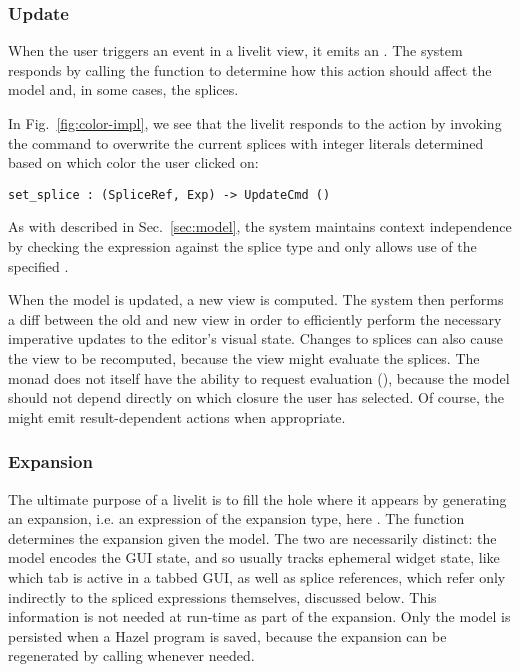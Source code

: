 \subsubsection{Update}\label{sec:def-update}
When the user triggers an event in a livelit view, it emits an .
The system responds by calling the  function to determine how 
this action should affect the model and, in some cases, the splices. 


In Fig.~\ref{fig:color-impl}, we see that the  livelit responds to 
the  action by invoking the  command to overwrite 
the current splices with integer literals determined based on which color the user
clicked on:
\begin{lstlisting}[numbers=none]
  set_splice : (SpliceRef, Exp) -> UpdateCmd ()
\end{lstlisting}
As with  described in Sec.~\ref{sec:model},
the system maintains context independence by checking the expression against the splice type 
and only allows use of the specified .

When the model is updated, a new view is 
computed. The system then performs a diff between the old and new view in order to 
efficiently perform the necessary imperative updates to the editor's visual state.
Changes to splices can also cause the view to be recomputed, because the view might 
evaluate the splices. The  monad does not itself 
have the ability to request evaluation (), because the model should not depend directly  
on which closure the user has selected. 
Of course, the  might emit 
result-dependent actions when appropriate.

\subsubsection{Expansion}
\label{sec:expansion}
The ultimate purpose of a livelit is to fill the hole where it appears by generating an expansion,
i.e. an expression of the expansion type, here .
The  function determines the expansion given the model. 
The two are necessarily distinct: the model encodes the GUI state, 
and so usually tracks ephemeral widget state, like which tab is active in a tabbed GUI, 
as well as splice references, which refer only indirectly to the spliced expressions themselves, discussed below. 
This information is not needed at run-time as part of the expansion.
Only the model is persisted when a Hazel program is saved, because the expansion 
can be regenerated by calling  whenever needed.

